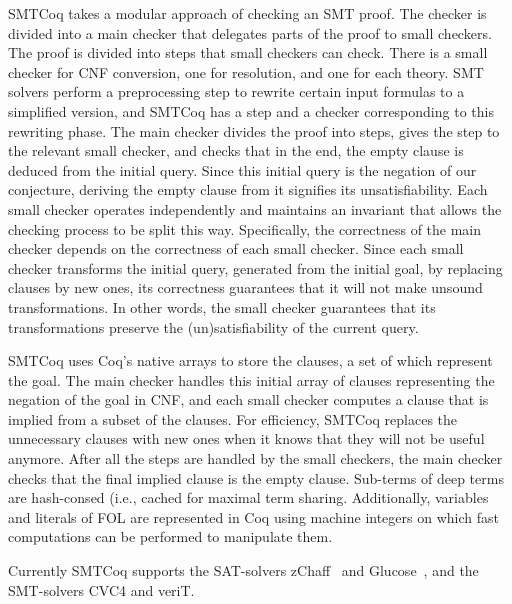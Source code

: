 \documentclass{article}
\begin{document}
	SMTCoq takes a modular approach of checking an
	SMT proof. The checker is divided into a main checker 
	that delegates parts of the proof to small checkers. 
	The proof is divided into steps that small checkers 
	can check. There is a small checker for CNF 
	conversion, one for resolution, and one for each theory. 
	SMT solvers perform a preprocessing 
	step to rewrite certain input formulas to 
	a simplified version, and SMTCoq has a step 
	and a checker corresponding 
	to this rewriting phase. The main checker divides the 
	proof into steps, gives the step to the relevant 
	small checker, and checks that in the 
	end, the empty clause is deduced from the initial query.
	Since this initial query is the negation of our 
	conjecture, deriving the empty clause from it 
	signifies its unsatisfiability. Each small checker 
	operates independently and maintains an invariant 
	that allows the checking process to be split this way.
	Specifically, the correctness of the main checker 
	depends on the correctness of each small checker.
	Since each small checker transforms the initial 
	query, generated from the initial goal,
	by replacing clauses by new ones, its 
	correctness guarantees that it will not make
	unsound transformations. In other words, the 
	small checker guarantees that its transformations 
	preserve the (un)satisfiability of the current query.
	
	SMTCoq uses Coq's native arrays to store the clauses, 
	a set of which represent the goal. The main checker 
	handles this initial array of clauses representing 
	the negation of the goal in CNF, and each small 
	checker computes a clause that is implied from a 
	subset of the clauses. For efficiency, SMTCoq 
	replaces the unnecessary clauses with new ones 
	when it knows that they will not be useful anymore. 
	After all the steps are handled by the small 
	checkers, the main checker checks that the final 
	implied clause is the empty clause. Sub-terms of 
	deep terms are hash-consed (i.e., cached for maximal 
	term sharing. Additionally, variables and literals 
	of FOL are represented in Coq using machine 
	integers on which fast computations can be 
	performed to manipulate them.
	
	Currently SMTCoq supports the SAT-solvers 
	zChaff~\cite{10.1007/11527695_27} and 
	Glucose~\cite{10.5555/1661445.1661509}, and 
	the SMT-solvers CVC4 and veriT. 
	
\end{document}

